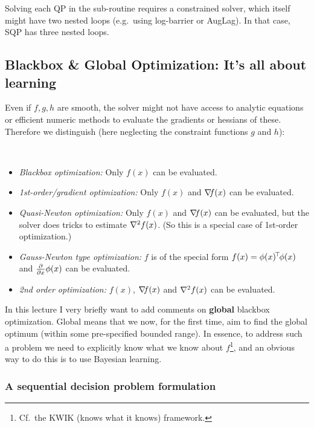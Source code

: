 Solving each QP in the sub-routine requires a constrained solver,
which itself might have two nested loops (e.g.\ using log-barrier or
AugLag). In that case, SQP has three nested loops.



\subsection{Blackbox \& Global Optimization: It's all about learning}

Even if $f,g,h$ are smooth, the solver might not have access to
analytic equations or efficient numeric methods to evaluate the
gradients or hessians of these. Therefore we distinguish (here
neglecting the constraint functions $g$ and $h$):
\begin{myDefinition}
~
\begin{itemize}
\item \emph{Blackbox optimization:} Only $f(x)$ can be evaluated.

\item \emph{1st-order/gradient optimization:} Only $f(x)$ and ${\nabla_{\!\!}} f(x)$ can be evaluated.

\item \emph{Quasi-Newton optimization:} Only $f(x)$ and ${\nabla_{\!\!}} f(x)$ can be
evaluated, but the solver does tricks to estimate ${\nabla_{\!\!}^2} f(x)$. (So this
is a special case of 1st-order optimization.)

\item \emph{Gauss-Newton type optimization:} $f$ is of the special
form $f(x) = \phi(x)^{\!\top\!} \phi(x)$ and $\textstyle\frac{\partial}{\partial x}\phi(x)$ can be evaluated.

\item \emph{2nd order optimization:} $f(x)$, ${\nabla_{\!\!}} f(x)$ and ${\nabla_{\!\!}^2} f(x)$ can be
evaluated.
\end{itemize}
\end{myDefinition}

In this lecture I very briefly want to add comments on \textbf{global}
blackbox optimization. Global means that we now, for the first time,
aim to find the global optimum (within some pre-specified
bounded range). In essence, to address such a problem we need to
explicitly know what we know about $f$\footnote{Cf.\ the KWIK (knows
what it knows) framework.}, and an obvious way to do this is to use
Bayesian learning.

\subsubsection{A sequential decision problem formulation}

